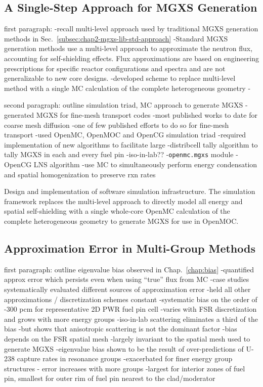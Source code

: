 \subsection{A Single-Step Approach for MGXS Generation}
\label{subsec:chap12-single-step}

first paragraph: 
-recall multi-level approach used by traditional \ac{MGXS} generation methods in Sec.~\ref{subsec:chap2-mgxs-lib-std-approach}
-Standard \ac{MGXS} generation methods use a multi-level approach to approximate the neutron flux, accounting for self-shielding effects. Flux approximations are based on engineering prescriptions for specific reactor configurations and spectra and are not generalizable to new core designs.
-developed scheme to replace multi-level method with a single \ac{MC} calculation of the complete heterogeneous geometry
-

second paragraph: outline simulation triad, \ac{MC} approach to generate \ac{MGXS}
-generated \ac{MGXS} for fine-mesh transport codes
  -most published works to date for coarse mesh diffusion
  -one of few published efforts to do so for fine-mesh transport
-used OpenMC, OpenMOC and OpenCG simulation triad
-required implementation of new algorithms to facilitate large 
  -distribcell tally algorithm to tally MGXS in each and every fuel pin
  -iso-in-lab??
  -\texttt{openmc.mgxs} module
  -OpenCG \ac{LNS} algorithm
  -use MC to simultaneously perform energy condensation and spatial homogenization to preserve rxn rates

Design and implementation of software simulation infrastructure. The simulation framework replaces the multi-level approach to directly model all energy and spatial self-shielding with a single whole-core OpenMC calculation of the complete heterogeneous geometry to generate MGXS for use in OpenMOC.

\subsection{Approximation Error in Multi-Group Methods}
\label{subsec:chap12-approx-error}

first paragraph: outline eigenvalue bias observed in Chap.~\ref{chap:bias}
-quantified approx error which persists even when using ``true'' flux from \ac{MC}
-case studies systematically evaluated different sources of approximation error
  -held all other approximations / discretization schemes constant
-systematic bias on the order of -300 \ac{pcm} for representative 2D \ac{PWR} fuel pin cell
  -varies with \ac{FSR} discretization and grows with more energy groups
  -iso-in-lab scattering eliminates a third of the bias
    -but shows that anisotropic scattering is not the dominant factor
  -bias depends on the \ac{FSR} spatial mesh
    -largely invariant to the spatial mesh used to generate \ac{MGXS}
-eigenvalue bias shown to be the result of over-predictions of U-238 capture rates in resonance groups
  -exacerbated for finer energy group structures - error increases with more groups
  -largest for interior zones of fuel pin, smallest for outer rim of fuel pin nearest to the clad/moderator


